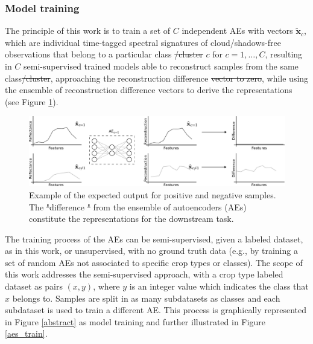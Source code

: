 \documentclass[journal,article,submit,pdftex,moreauthors]{Definitions/mdpi}
\providecommand{\DIFadd}[1]{{\protect\color{blue}\uwave{#1}}} %
\providecommand{\DIFdel}[1]{{\protect\color{red}\sout{#1}}}                      %
\providecommand{\DIFaddbegin}{} %
\providecommand{\DIFaddend}{} %
\providecommand{\DIFdelbegin}{} %
\providecommand{\DIFdelend}{} %
\providecommand{\DIFdelFL}[1]{\DIFdel{#1}} %
\providecommand{\DIFdelbeginFL}{} %
\providecommand{\DIFdelendFL}{} %
\begin{document}
\subsubsection{Model training}\DIFaddbegin \label{training}
\DIFaddend The principle of this work is to train a set of $C$ independent AEs with vectors $\mathbf{\tilde{x}}_c$, which are individual time-tagged spectral signatures of cloud/shadows-free observations that belong to a particular class \DIFdelbegin \DIFdel{/cluster }\DIFdelend $c$ for $c=1,\dots,C$,  resulting in $C$ semi-supervised trained models able to reconstruct samples from the same class\DIFdelbegin \DIFdel{/cluster}\DIFdelend , approaching the reconstruction difference \DIFdelbegin \DIFdel{vector to zero}\DIFdelend \DIFaddbegin \DIFadd{to the zero vector}\DIFaddend , while using the ensemble of reconstruction difference vectors to derive the representations (see Figure \ref{errors}).

\begin{figure}[H]
	\includegraphics[width=\textwidth]{figures/AE_example_corrected.pdf}
	\caption{Example of the expected output for positive and negative samples. The \DIFdelbeginFL \DIFdelFL{"}\DIFdelendFL difference \DIFdelbeginFL \DIFdelFL{" }\DIFdelendFL from the ensemble of autoencoders (AEs) constitute the representations for the downstream task.}
	\label{errors}
\end{figure}
The training process of the AEs can be semi-supervised, given a labeled dataset, as in this work, or unsupervised, with no ground truth data (e.g., by training a set of random \ac{AEs} not associated to specific crop types or classes). 
The scope of this work addresses the semi-supervised approach, with a crop type labeled dataset as pairs $(x,y)$, where $y$ is an integer value which indicates the class that $x$ belongs to. Samples are split in as many subdatasets as classes and each subdataset is used to train a different AE.
This process is graphically represented in Figure \ref{abstract} as model training and further illustrated in Figure \ref{aes_train}.
\end{document}

